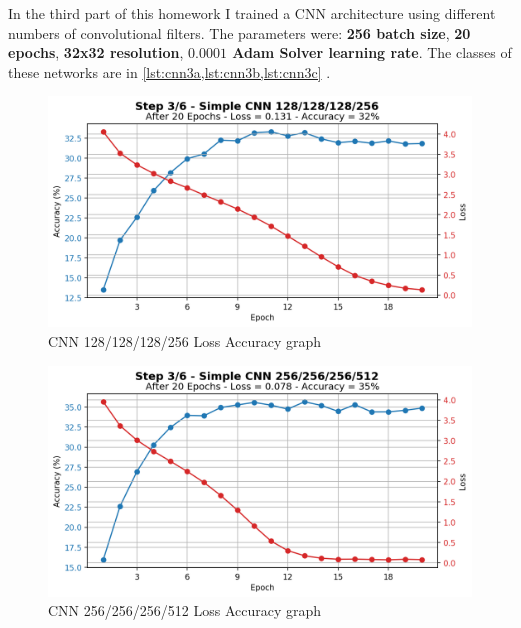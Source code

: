 \documentclass[a4paper, 11pt]{article}
\begin{document}
	In the third part of this homework I trained a CNN architecture using different numbers of convolutional filters. The parameters were: \textbf{256 batch size}, \textbf{20 epochs}, \textbf{32x32 resolution}, \textbf{$\boldsymbol{0.0001}$ Adam Solver learning rate}. The classes of these networks are in \vref{lst:cnn3a,lst:cnn3b,lst:cnn3c} .
	
	
	
	\begin{figure}[ht!]
		\centering
		\includegraphics[width=0.6\paperwidth]{img/fig03a.png}
		\caption{CNN 128/128/128/256 Loss Accuracy graph}
		\label{fig:03a}
	\end{figure}
	\begin{figure}[ht!]
		\centering
		\includegraphics[width=0.6\paperwidth]{img/fig03b.png}
		\caption{CNN 256/256/256/512 Loss Accuracy graph}
		\label{fig:03b}
	\end{figure}
\end{document}
